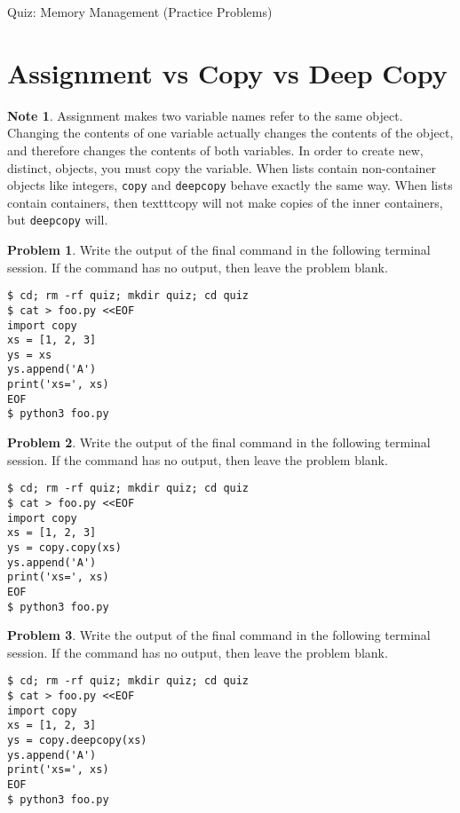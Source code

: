 \documentclass[10pt]{article}
\theoremstyle{definition}
\newtheorem{problem}{Problem}
\newtheorem{note}{Note}
\begin{document}
\begin{center}
    {
\Large
    Quiz: Memory Management (Practice Problems)
}

    \vspace{0.1in}
\end{center}

\section{Assignment vs Copy vs Deep Copy}

\begin{note}
Assignment makes two variable names refer to the same object.
Changing the contents of one variable actually changes the contents of the object,
and therefore changes the contents of both variables.
In order to create new, distinct, objects, you must copy the variable.
When lists contain non-container objects like integers, \texttt{copy} and \texttt{deepcopy} behave exactly the same way.
    When lists contain containers, then texttt{copy} will not make copies of the inner containers, but \texttt{deepcopy} will.
\end{note}

\filbreak
\begin{problem}
    Write the output of the final command in the following terminal session.
    If the command has no output, then leave the problem blank.
\end{problem}
\begin{lstlisting}
$ cd; rm -rf quiz; mkdir quiz; cd quiz
$ cat > foo.py <<EOF
import copy
xs = [1, 2, 3]
ys = xs
ys.append('A')
print('xs=', xs)
EOF
$ python3 foo.py
\end{lstlisting}

\filbreak
\begin{problem}
    Write the output of the final command in the following terminal session.
    If the command has no output, then leave the problem blank.
\end{problem}
\begin{lstlisting}
$ cd; rm -rf quiz; mkdir quiz; cd quiz
$ cat > foo.py <<EOF
import copy
xs = [1, 2, 3]
ys = copy.copy(xs)
ys.append('A')
print('xs=', xs)
EOF
$ python3 foo.py
\end{lstlisting}


\filbreak
\begin{problem}
    Write the output of the final command in the following terminal session.
    If the command has no output, then leave the problem blank.
\end{problem}
\begin{lstlisting}
$ cd; rm -rf quiz; mkdir quiz; cd quiz
$ cat > foo.py <<EOF
import copy
xs = [1, 2, 3]
ys = copy.deepcopy(xs)
ys.append('A')
print('xs=', xs)
EOF
$ python3 foo.py
\end{lstlisting}
\end{document}
